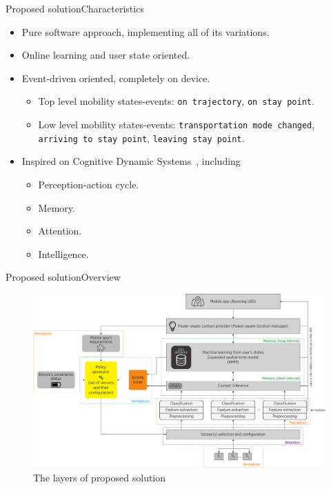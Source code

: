 \documentclass[9pt,xcolor={dvipsnames},handout]{beamer}
\begin{document}
\begin{frame}{Proposed solution}{Characteristics}
\begin{itemize}
  \item Pure software approach, implementing all of its variations.
  \pause
  \item Online learning and user state oriented.
  \pause
  \item Event-driven oriented, completely on device.
  \begin{itemize}
    \item Top level mobility states-events: \texttt{on trajectory}, \texttt{on stay point}.
    \pause
    \item Low level mobility states-events: \texttt{transportation mode changed}, \texttt{arriving to stay point}, \texttt{leaving stay point}.
    \pause
  \end{itemize}
  \item Inspired on Cognitive Dynamic Systems~\cite{Haykin2006}, including 
  \begin{itemize}
    \item Perception-action cycle.
    \pause
    \item Memory.
    \pause
    \item Attention.
    \pause
    \item Intelligence.
  \end{itemize}
\end{itemize}
\end{frame}

\begin{frame}{Proposed solution}{Overview}
\begin{figure}
  \centering
  \includegraphics[width=\textwidth]{vectors/solution-general-overview}
  \caption{The layers of proposed solution}
  \label{fig:solution}
\end{figure}
\end{frame}
\end{document}
